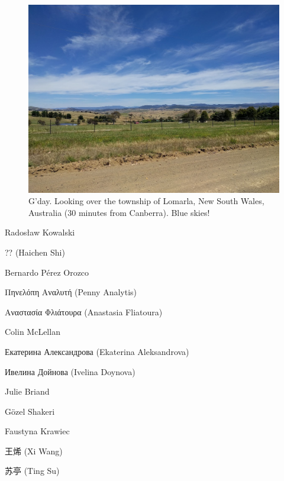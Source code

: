 \begin{preamble}
\renewcommand{\figurename}{Picture}
\begin{figure}
    \begin{center}
    \vspace*{-9mm}
    \includegraphics[width=1\textwidth]{figures/ch0-australia.jpg}
    \end{center}
    \vspace*{-6mm}
    \caption[]{G'day. Looking over the township of Lomarla, New South Wales, Australia (30 minutes from Canberra). Blue skies!}
    \label{fig:acks_australia}
\end{figure}
\renewcommand{\figurename}{Figure}





Rados\l{}aw Kowalski

?? (Haichen Shi)

Bernardo P\'{e}rez Orozco

Πηνελόπη Αναλυτή (Penny Analytis)

Αναστασία Φλιάτουρα (Anastasia Fliatoura)

Colin McLellan

Екатерина Александрова (Ekaterina Aleksandrova)

Ивелина Дойнова (Ivelina Doynova)

Julie Briand

G\"{o}zel Shakeri

Faustyna Krawiec

{\asianfont 王烯} (Xi Wang)

{\asianfont 苏亭} (Ting Su)


\end{preamble}
